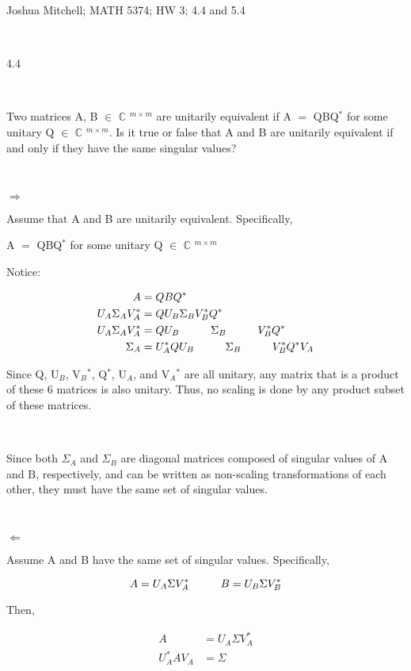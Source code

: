 \documentclass[12pt]{article}
\newcommand{\mt}[1]{\ensuremath{#1}}
\newcommand{\bc}{\mt{\mathbb{C}} }       %
\newcommand{\mem}{\mt{\in} }
\newcommand{\rar}{ \mt{\Rightarrow} }     %
\newcommand{\lar}{ \mt{\Leftarrow} }      %
\newcommand{\eql}{\mt{=} }
\newcommand{\uw}[2]{#1\mt{_{#2}}}
\newcommand{\uf}[2]{#1\mt{^{#2}}}
\newcommand{\splt}[1]{\begin{split}#1\end{split}}
\newcommand\tab[1][1cm]{\hspace*{#1}}
\begin{document}
Joshua Mitchell; MATH 5374; HW 3; 4.4 and 5.4

\

4.4

\

Two matrices A, B \mem \uf{\bc}{m \times m} are unitarily equivalent if A \eql QB\uf{Q}{*} for some unitary Q \mem \uf{\bc}{m \times m}. Is it true or false that A and B are unitarily equivalent if and only if they have the same singular values?

\

\rar 

Assume that A and B are unitarily equivalent. Specifically,

A \eql QB\uf{Q}{*} for some unitary Q \mem \uf{\bc}{m \times m}

Notice:

\begin{displaymath}
  \splt{A & = QBQ^* \\
  U_A \Sigma_A V^*_A & = Q U_B \Sigma_B V_B^*Q^* \\
  U_A \Sigma_A V^*_A & = Q U_B \tab \Sigma_B \tab V_B^*Q^* \\
  \Sigma_A & = U_A^* Q U_B \tab \Sigma_B \tab V_B^*Q^* V_A \\
  }
\end{displaymath}

Since Q, \uw{U}{B}, \uf{\uw{V}{B}}{*}, \uf{Q}{*}, \uw{U}{A}, and \uf{\uw{V}{A}}{*} are all unitary, any matrix that is a product of these 6 matrices is also unitary. Thus, no scaling is done by any product subset of these matrices.


\

Since both \uw{$\Sigma$}{A} and \uw{$\Sigma$}{B} are diagonal matrices composed of singular values of A and B, respectively, and can be written as non-scaling transformations of each other, they must have the same set of singular values.

\

\lar

Assume A and B have the same set of singular values. Specifically,

\begin{displaymath}
  A = U_A \Sigma V^*_A \tab B = U_B \Sigma V^*_B
\end{displaymath}

Then,

\begin{displaymath}
\splt{
A & = U_A \Sigma V^*_A \\
U^*_A A V_A & = \Sigma
}
\end{displaymath}
\end{document}

